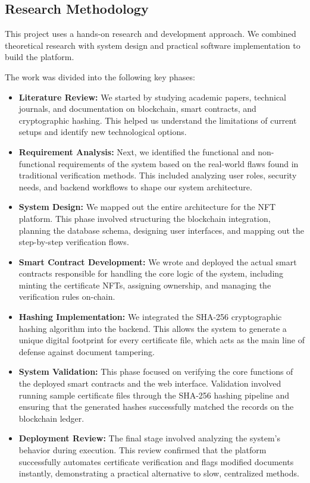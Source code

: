 \subsection{Research Methodology}

This project uses a hands-on research and development approach. We combined theoretical research with system design and practical software implementation to build the platform.

The work was divided into the following key phases:

\begin{itemize}

    \item \textbf{Literature Review:} We started by studying academic papers, technical journals, and documentation on blockchain, smart contracts, and cryptographic hashing. This helped us understand the limitations of current setups and identify new technological options.

    \item \textbf{Requirement Analysis:} Next, we identified the functional and non-functional requirements of the system based on the real-world flaws found in traditional verification methods. This included analyzing user roles, security needs, and backend workflows to shape our system architecture.

    \item \textbf{System Design:} We mapped out the entire architecture for the NFT platform. This phase involved structuring the blockchain integration, planning the database schema, designing user interfaces, and mapping out the step-by-step verification flows.

    \item \textbf{Smart Contract Development:} We wrote and deployed the actual smart contracts responsible for handling the core logic of the system, including minting the certificate NFTs, assigning ownership, and managing the verification rules on-chain.

    \item \textbf{Hashing Implementation:} We integrated the SHA-256 cryptographic hashing algorithm into the backend. This allows the system to generate a unique digital footprint for every certificate file, which acts as the main line of defense against document tampering.

    \item \textbf{System Validation:} This phase focused on verifying the core functions of the deployed smart contracts and the web interface. Validation involved running sample certificate files through the SHA-256 hashing pipeline and ensuring that the generated hashes successfully matched the records on the blockchain ledger.

    \item \textbf{Deployment Review:} The final stage involved analyzing the system's behavior during execution. This review confirmed that the platform successfully automates certificate verification and flags modified documents instantly, demonstrating a practical alternative to slow, centralized methods.
\end{itemize}